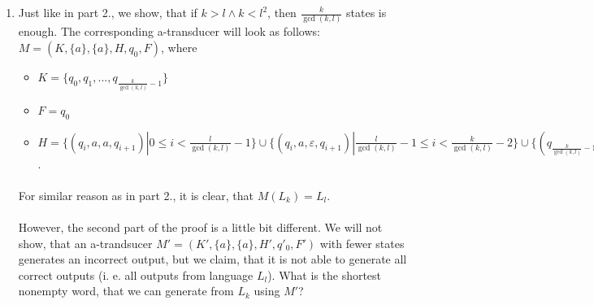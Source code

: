 \begin{enumerate}
\paragraph{}
It is easy to see, that the number of iterations of this cycle on a correct input (from $L_k$) is divisible by $\gcd(k,l)$. Each iteration creates $\frac{l}{\gcd(k,l)}$ symbols $a$ on the output, therefore $M(L_k) = L_l$.

\paragraph{}
Now we need to prove, that this number really forms a lower bound for state count: suppose, that there is an a-transducer $M' = (K, \{a\}, \{a\}, H, q_0, F)$ with at most $\frac{l}{\gcd(k,l)} -1$ states. Similarly to the proof of part 1., we look for a cycle, in this case of the length $\frac{l}{\gcd(k,l)} - 1$ states. With very similar series of arguments, we can construct two inputs $x' \equiv x.a^{k.r}$ and $x'' \equiv x.a^{2k.r}$, which produce outputs $y' \equiv y.a^{k.s}$ and $y'' \equiv y.a^{2k.s}$, respectively. If both of these numbers were divisible by $l$, then also $k.s$ would be divisible by $l$. However, this is not possible, since $s < \frac{l}{\gcd(k,l)}$ and as stated in Chapter 1 \color{red}(probably)\color{black}, $\lcm(k,l) = \frac{k.l}{\gcd(k,l)}$.  

\item Just like in part 2., we show, that if $k > l \land k < l^2$, then $\frac{k}{\gcd(k,l)}$ states is enough. The corresponding a-transducer will look as follows: $M = (K, \{ a\}, \{ a\}, H, q_0, F)$, where 

\begin{itemize}
\item $K = \{ q_0, q_1,  ..., q_{\frac{k}{\gcd(k,l)}-1 }\}$
\item $F = q_0$
\item $H = \{(q_i, a, a, q_{i+1})| 0 \leq i < \frac{l}{\gcd(k,l)}-1 \} \cup \{(q_i, a, \varepsilon, q_{i+1})| \frac{l}{\gcd(k,l)}-1 \leq i < \frac{k}{\gcd(k,l)}-2 \} \cup \{ (q_{\frac{k}{\gcd(k,l)}-1}, \varepsilon, a, q_0) \}$.
\end{itemize}
\paragraph{}
For similar reason as in part 2., it is clear, that $M(L_k) = L_l$.

\paragraph{}
However, the second part of the proof is a little bit different. We will not show, that an a-trandsucer $M' = (K', \{a\}, \{a\}, H', q'_0, F')$ with fewer states generates an incorrect output, but we claim, that it is not able to generate all correct outputs (i. e. all outputs from language $L_l$).
What is the shortest nonempty  word, that we can generate from $L_k$ using $M'$?


\end{enumerate}
